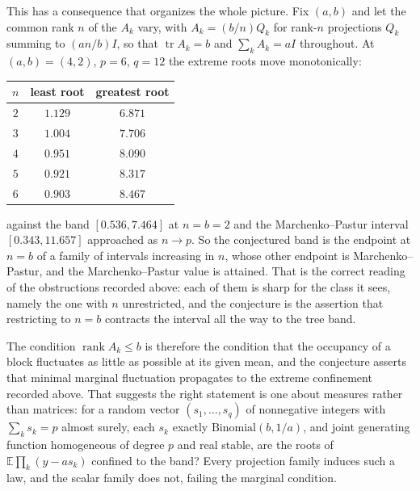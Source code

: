 \documentclass[11pt]{article}
\theoremstyle{remark}
\begin{document}
This has a consequence that organizes the whole picture. Fix $(a,b)$ and let the
common rank $n$ of the $A_k$ vary, with $A_k=(b/n)Q_k$ for rank-$n$ projections
$Q_k$ summing to $(an/b)I$, so that $\operatorname{tr}A_k=b$ and $\sum_kA_k=aI$
throughout. At $(a,b)=(4,2)$, $p=6$, $q=12$ the extreme roots move monotonically:
\begin{center}
\begin{tabular}{ccc}
\hline
$n$ & least root & greatest root\\
\hline
$2$ & $1.129$ & $6.871$\\
$3$ & $1.004$ & $7.706$\\
$4$ & $0.951$ & $8.090$\\
$5$ & $0.921$ & $8.317$\\
$6$ & $0.903$ & $8.467$\\
\hline
\end{tabular}
\end{center}
against the band $[0.536,7.464]$ at $n=b=2$ and the Marchenko--Pastur interval
$[0.343,11.657]$ approached as $n\to p$. So the conjectured band is the endpoint at
$n=b$ of a family of intervals increasing in $n$, whose other endpoint is
Marchenko--Pastur, and the Marchenko--Pastur value is attained. That is the correct
reading of the obstructions recorded above: each of them is sharp for the class it
sees, namely the one with $n$ unrestricted, and the conjecture is the assertion that
restricting to $n=b$ contracts the interval all the way to the tree band.

The condition $\operatorname{rank}A_k\le b$ is therefore the condition that the
occupancy of a block fluctuates as little as possible at its given mean, and the
conjecture asserts that minimal marginal fluctuation propagates to the extreme
confinement recorded above. That suggests the right statement is one about measures
rather than matrices: for a random vector $(s_1,\dots,s_q)$ of nonnegative integers
with $\sum_ks_k=p$ almost surely, each $s_k$ exactly $\mathrm{Binomial}(b,1/a)$, and
joint generating function homogeneous of degree $p$ and real stable, are the roots
of $\mathbb E\prod_k(y-as_k)$ confined to the band? Every projection family induces
such a law, and the scalar family does not, failing the marginal condition.
\end{document}
